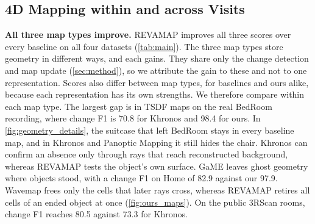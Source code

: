 \documentclass[10pt,twocolumn,letterpaper]{article}
\newcommand{\ours}{REVAMAP\xspace}
\begin{document}
\subsection{4D Mapping within and across Visits}
\label{sec:exp_main}

\noindent\textbf{All three map types improve.}
\ours improves all three scores over every baseline on all four datasets (\cref{tab:main}). The three map types store geometry in different ways, and each gains. They share only the change detection and map update (\cref{sec:method}), so we attribute the gain to these and not to one representation. Scores also differ between map types, for baselines and ours alike, because each representation has its own strengths. We therefore compare within each map type. The largest gap is in TSDF maps on the real BedRoom recording, where change F1 is 70.8 for Khronos and 98.4 for ours. In \cref{fig:geometry_details}, the suitcase that left BedRoom stays in every baseline map, and in Khronos and Panoptic Mapping it still hides the chair. Khronos can confirm an absence only through rays that reach reconstructed background, whereas \ours tests the object's own surface. GaME leaves ghost geometry where objects stood, with a change F1 on Home of 82.9 against our 97.9. Wavemap frees only the cells that later rays cross, whereas \ours retires all cells of an ended object at once (\cref{fig:ours_maps}). On the public 3RScan rooms, change F1 reaches 80.5 against 73.3 for Khronos.
\end{document}
